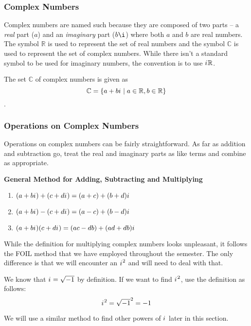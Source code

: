 \documentclass[addpoints,12pt]{exam}
\theoremstyle{definition}
\newcommand{\iu}{{i\mkern1mu}}
\begin{document}
\subsubsection*{Complex Numbers}
Complex numbers are named such because they are composed of two parts -- a \emph{real} part ($a$) and an \emph{imaginary} part ($b\i$) where both $a$ and $b$ are real numbers. The symbol $\mathbb{R}$ is used to represent the set of real numbers and the symbol $\mathbb{C}$ is used to represent the set of complex numbers. While there isn't a standard symbol to be used for imaginary numbers, the convention is to use $\iu\mathbb{R}$.

The set $\mathbb{C}$ of complex numbers is given as \[\mathbb{C} = \{a+b\iu \mid a\in \mathbb{R}, b \in\mathbb{R}\}\].

\subsubsection*{Operations on Complex Numbers}
Operations on complex numbers can be fairly straightforward. As far as addition and subtraction go, treat the real and imaginary parts as like terms and combine as appropriate.
\vspace{.25in}

\begin{mdframed}
\textbf{General Method for Adding, Subtracting and Multiplying}\mbox{}\\
\begin{enumerate}
\item $(a+b\iu) + (c+d\iu) = (a+c)+(b+d)\iu$
\item $(a+b\iu) - (c+d\iu) = (a-c)+(b-d)\iu$
\item $(a+b\iu)(c+d\iu) = (ac-db) + (ad+db)\iu$
\end{enumerate}
\end{mdframed}

\vspace{.25in}
While the definition for multiplying complex numbers looks unpleasant, it follows the FOIL method that we have employed throughout the semester. The only difference is that we will encounter an $\iu^2$ and will need to deal with that.

\vspace{.25in}
We know that $\iu = \sqrt{-1}$ by definition. If we want to find $\iu^2$, use the definition as follows:
\[\iu^2 = \sqrt{-1}^2 = -1\]

We will use a similar method to find other powers of $\iu$ later in this section.
\end{document}
